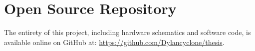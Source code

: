 \chapter{Open Source Repository} %

\label{AppendixC} %

The entirety of this project, including hardware schematics and software code, is available online on GitHub at: \url{https://github.com/Dylancyclone/thesis}.